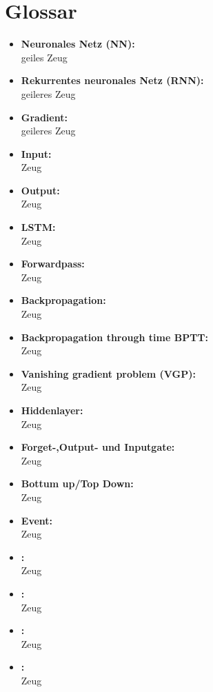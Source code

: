 \chapter{Glossar} 
\label{ch:glossar}
	\begin{itemize}
		\item \textbf{Neuronales Netz (NN):}\\
		geiles Zeug
		\item \textbf{Rekurrentes neuronales Netz (RNN):}\\
		geileres Zeug
		\item \textbf{Gradient:}\\
		geileres Zeug
		\item \textbf{Input:}\\
		Zeug
		\item \textbf{Output:}\\
		Zeug
		\item \textbf{LSTM:}\\
		Zeug
		\item \textbf{Forwardpass:}\\
		Zeug
		\item \textbf{Backpropagation:}\\
		Zeug
		\item \textbf{Backpropagation through time BPTT:}\\
		Zeug
		\item \textbf{Vanishing gradient problem (VGP):}\\
		Zeug
		\item \textbf{Hiddenlayer:}\\
		Zeug
		\item \textbf{Forget-,Output- und Inputgate:}\\
		Zeug
		\item \textbf{Bottum up/Top Down:}\\
		Zeug
		\item \textbf{Event:}\\
		Zeug
		\item \textbf{:}\\
		Zeug
		\item \textbf{:}\\
		Zeug
		\item \textbf{:}\\
		Zeug
		\item \textbf{:}\\
		Zeug
		
		
		
	
	\end{itemize}